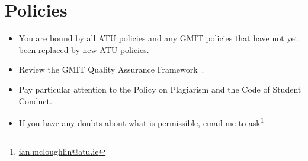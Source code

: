 \documentclass{iansnotes}
\begin{document}
\section{Policies}

\begin{itemize}
  \item You are bound by all ATU policies and any GMIT policies that have not yet been replaced by new ATU policies.
  \item Review the GMIT Quality Assurance Framework~\autocite{gmitqaf}.
  \item Pay particular attention to the Policy on Plagiarism and the Code of Student Conduct.
  \item If you have any doubts about what is permissible, email me to ask\footnote{\url{ian.mcloughlin@atu.ie}}.
\end{itemize}
\end{document}
